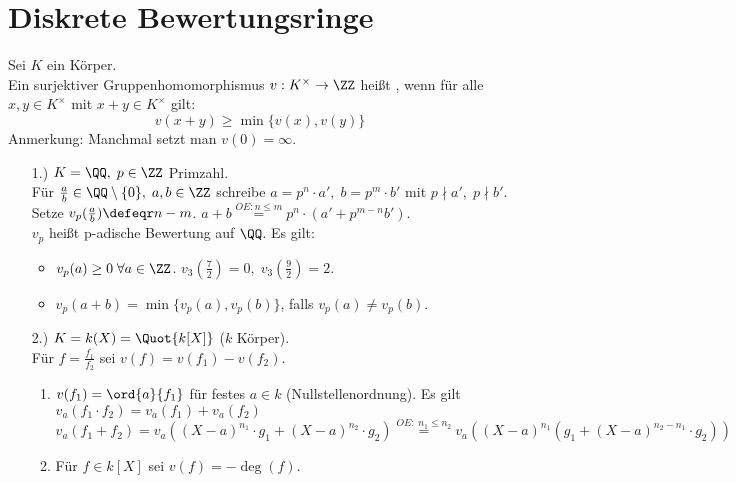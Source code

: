 \section{Diskrete Bewertungsringe}

\begin{Def} 
Sei $K$ ein Körper.\\
Ein surjektiver Gruppenhomomorphismus $v: K^{\times} \to \ZZ$ heißt
, wenn für alle $x,y \in
K^{\times}$ mit $x + y \in K^{\times}$ gilt:
$$ v(x+y) \geq \min\{v(x),v(y)\}$$
Anmerkung: Manchmal setzt man $v(0) = \infty$.
\end{Def}

\begin{nnBsp} 
\begin{enumerate}
  \item[1.)] $K = \QQ, \; p \in \ZZ$ Primzahl.\\
  Für $\frac{a}{b} \in \QQ \setminus \{0\}, \; a,b \in \ZZ$
  schreibe $a = p^n \cdot a', \; b = p^m \cdot b'$ mit $p \nmid a',\; p \nmid
  b'$.\\
  Setze $v_p(\frac{a}{b}) \defeqr n - m$.
  $a + b \overset{O\!\!E: n \leq m}{=} p^n \cdot (a' + p^{m-n} b')$.\\
  $v_p$ heißt p-adische Bewertung auf $\QQ$. Es gilt:
  \begin{itemize}
    \item $v_p(a) \geq 0 \; \forall a \in \ZZ$. $v_3(\frac{7}{2}) = 0, \;
    v_3(\frac{9}{2})= 2$.
    \item $v_p(a+b) = \min\{v_p(a),v_p(b)\}$, falls $v_p(a) \not= v_p(b)$.
  \end{itemize}
  \item[2.)] $K = k(X) = \Quot{k[X]}$ ($k$ Körper).\\
  Für $f = \frac{f_1}{f_2}$ sei $v(f) = v(f_1) - v(f_2)$.
  \begin{enumerate}
    \item $v(f_1) = \ord{a}{f_1}$ für festes $a \in k$
    (Nullstellenordnung).
    Es gilt $v_a(f_1 \cdot f_2) = v_a(f_1) + v_a(f_2)$
    $v_a(f_1 + f_2) = v_a((X-a)^{n_1} \cdot g_1 + (X-a)^{n_2} \cdot g_2)
    \overset{O\!\!E: \; n_1 \leq n_2}{=} v_a((X-a)^{n_1}(g_1 + (X-a)^{n_2 - 
    n_1} \cdot g_2))$
    \item Für $f \in k[X]$ sei $v(f) = - \deg (f)$.
  \end{enumerate}
\end{enumerate}
\end{nnBsp}

